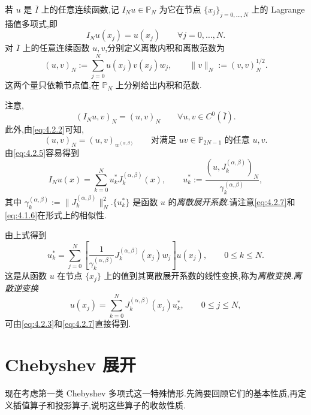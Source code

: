 若 \(u\) 是 \(\overline I\) 上的任意连续函数,记 \(I_Nu\in\mathbb P_N\) 为它在节点 \(\{x_j\}_{j=0,\ldots,N}\) 上的 Lagrange 插值多项式,即
\begin{equation}\label{eq:4.2.3}
  I_Nu(x_j)=u(x_j)\qquad\forall j=0,\ldots,N.
\end{equation}
对 \(\overline I\) 上的任意连续函数 \(u,v\),分别定义离散内积和离散范数为
\begin{equation}\label{eq:4.2.4}
  (u,v)_N:=\sum_{j=0}^N u(x_j)v(x_j)w_j,\qquad
  \|v\|_N:=(v,v)_N^{1/2}.
\end{equation}
这两个量只依赖节点值,在 \(\mathbb P_N\) 上分别给出内积和范数.

注意,
\begin{equation}\label{eq:4.2.5}
  (I_Nu,v)_N=(u,v)_N\qquad\forall u,v\in C^0(\overline I).
\end{equation}
此外,由\eqref{eq:4.2.2}可知,
\begin{equation}\label{eq:4.2.6}
  (u,v)_N=(u,v)_{w^{(\alpha,\beta)}}\qquad
  \text{对满足 \(uv\in\mathbb P_{2N-1}\) 的任意 \(u,v\).}
\end{equation}
由\eqref{eq:4.2.5}容易得到
\begin{equation}\label{eq:4.2.7}
  I_Nu(x)=\sum_{k=0}^N u_k^*J_k^{(\alpha,\beta)}(x),\qquad
  u_k^*:=\frac{(u,J_k^{(\alpha,\beta)})_N}{\gamma_k^{(\alpha,\beta)}},
\end{equation}
其中 \(\gamma_k^{(\alpha,\beta)}:=\|J_k^{(\alpha,\beta)}\|_N^2\).\(\{u_k^*\}\) 是函数 \(u\) 的\emph{离散展开系数}.请注意\eqref{eq:4.2.7}和\eqref{eq:4.1.6}在形式上的相似性.

由上式得到
\begin{equation}\label{eq:4.2.8}
  u_k^*=\sum_{j=0}^N
    \left[\frac1{\gamma_k^{(\alpha,\beta)}}J_k^{(\alpha,\beta)}(x_j)w_j\right]u(x_j),
  \qquad 0\le k\le N.
\end{equation}
这是从函数 \(u\) 在节点 \(\{x_j\}\) 上的值到其离散展开系数的线性变换,称为\emph{离散变换}.\emph{离散逆变换}
\begin{equation}\label{eq:4.2.9}
  u(x_j)=\sum_{k=0}^N J_k^{(\alpha,\beta)}(x_j)u_k^*,\qquad 0\le j\le N,
\end{equation}
可由\eqref{eq:4.2.3}和\eqref{eq:4.2.7}直接得到.

\section{Chebyshev 展开}\label{sec:4.3}

现在考虑第一类 Chebyshev 多项式这一特殊情形.先简要回顾它们的基本性质,再定义插值算子和投影算子,说明这些算子的收敛性质.

